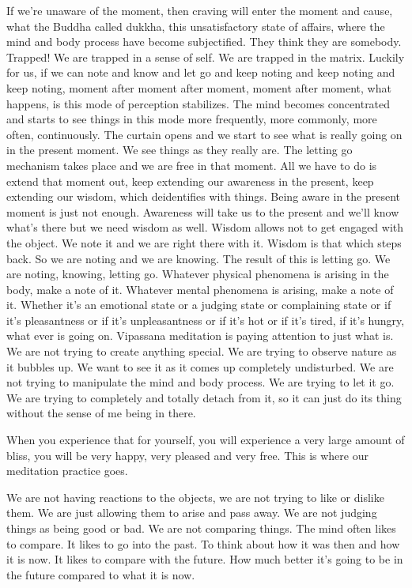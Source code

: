 \documentclass[letterpaper,10pt,english]{sphinxmanual}
\begin{document}
\sphinxAtStartPar
If we’re unaware of the moment, then craving will enter the moment
and  cause,  what  the  Buddha  called  dukkha,  this  unsatisfactory  state  of
affairs,  where  the  mind  and  body  process  have  become  subjectified. They
think they are somebody. Trapped! We are trapped in a sense of self. We are
trapped in the matrix. Luckily for us, if we can note and know and let go and
keep noting and keep noting and keep noting, moment after moment after
moment, moment after moment, what happens, is this mode of perception
stabilizes. The  mind  becomes  concentrated  and  starts  to  see  things  in  this
mode more frequently, more commonly, more often, continuously. The curtain opens and we start to see what is really going on in the present moment.
We see things as they really are. The letting go mechanism takes place and
  we are free in that moment. All we have to do is extend that moment out,
keep extending our awareness in the present, keep extending our wisdom,
which de\sphinxhyphen{}identifies with things. Being aware in the present moment is just
not  enough. Awareness  will  take  us  to  the  present  and  we’ll  know  what’s
there but we need wisdom as well. Wisdom allows not to get engaged with
the object. We note it and we are right there with it. Wisdom is that which
steps back. So we are noting and we are knowing. The result of this is letting go. We are noting, knowing, letting go. Whatever physical phenomena
is  arising  in  the  body,  make  a  note  of  it.  Whatever  mental  phenomena  is
arising, make a note of it. Whether it’s an emotional state or a judging state
or complaining state or if it’s pleasantness or if it’s unpleasantness or if it’s
hot or if it’s tired, if it’s hungry, what ever is going on. Vipassana meditation
is paying attention to just what is. We are not trying to create anything special. We are trying to observe nature as it bubbles up. We want to see it as it
comes up completely undisturbed. We are not trying to manipulate the mind
and  body  process. We  are  trying  to  let  it  go. We  are  trying  to  completely
and totally detach from it, so it can just do its thing without the sense of me
being in there.

\sphinxAtStartPar
When  you  experience  that  for  yourself,  you  will  experience  a  very
large amount of bliss, you will be very happy, very pleased and very free.
This is where our meditation practice goes.

\sphinxAtStartPar
We are not having reactions to the objects, we are not trying to like or
dislike them. We are just allowing them to arise and pass away. We are not
judging things as being good or bad. We are not comparing things. The mind
often likes to compare. It likes to go into the past. To think about how it was
then and how it is now. It likes to compare with the future. How much better
it’s going to be in the future compared to what it is now.
\end{document}
